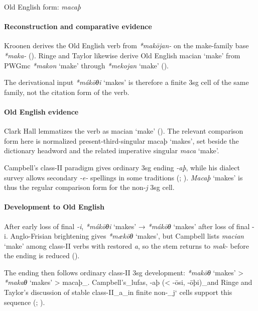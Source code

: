 \documentclass[
  british,
  a4paper,
]{article}
\providecommand{\Recon}[1]{\emph{*#1}}
\begin{document}
Old English form: \emph{macaþ}

\paragraph{Reconstruction and comparative
evidence}\label{reconstruction-and-comparative-evidence-135}

Kroonen derives the Old English verb from {\emph{*makōjan-}} on the
make-family base \emph{*maka-} (). Ringe and Taylor likewise derive Old English {macian} `make' from
PWGmc \Recon{makon} `make' through \Recon{mekojan} `make'
().

The derivational input \Recon{mákōθi} `makes' is therefore a finite 3sg
cell of the same family, not the citation form of the verb.

\paragraph{Old English evidence}\label{old-english-evidence-135}

Clark Hall lemmatizes the verb as {macian} `make'
(). The relevant
comparison form here is normalized present-third-singular {macaþ}
`makes', set beside the dictionary headword and the related imperative
singular {\emph{maca}} `make'.

Campbell's class-II paradigm gives ordinary 3sg ending \emph{-aþ}, while
his dialect survey allows secondary \emph{-e-} spellings in some
traditions (;
). {\emph{Macaþ}} `makes' is
thus the regular comparison form for the non-\emph{j} 3sg cell.

\paragraph{Development to Old
English}\label{development-to-old-english-135}

After early loss of final \emph{-i}, \Recon{mákōθi} `makes' →
\Recon{mákōθ} `makes' after loss of final -i. Anglo-Frisian brightening
gives \Recon{mækōθ} `makes', but Campbell lists {\emph{macian}} `make'
among class-II verbs with restored \emph{a}, so the stem returns to
\emph{mak-} before the ending is reduced
().

The ending then follows ordinary class-II 3sg development: \Recon{makōθ}
`makes' \textgreater{} \Recon{makaθ} `makes' \textgreater{} macaþ\_.
Campbell's\_lufas, -aþ (\textless{} -ōsi, -ōþi)\_and Ringe and Taylor's
discussion of stable class-II\_a\_in finite non-\_j` cells support this
sequence (;
).
\end{document}
